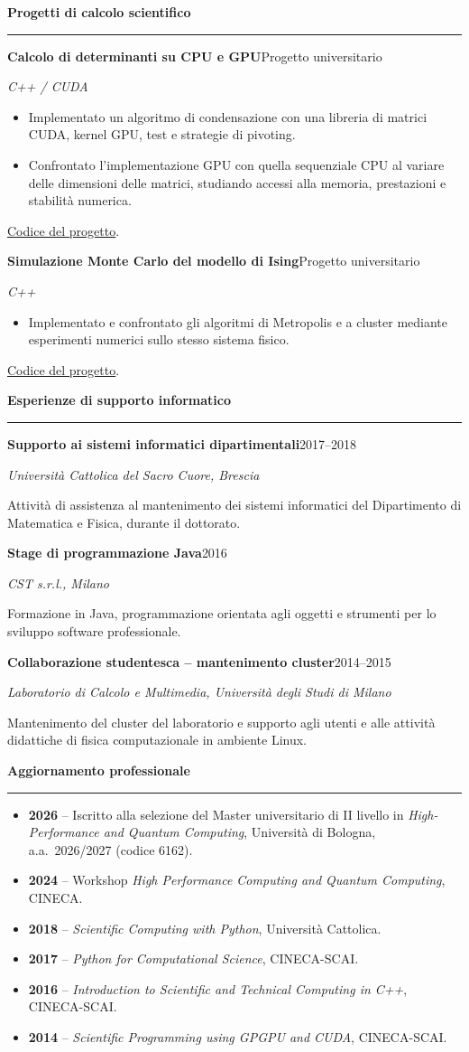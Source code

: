 \documentclass[10pt,a4paper]{article}
\newcommand{\cvsection}[1]{%
    \Needspace{4\baselineskip}%
    \vspace{0.8em}%
    {\large\bfseries\color{accent} #1}\par
    \vspace{0.2em}\hrule\vspace{0.45em}%
}
\newcommand{\entry}[4]{%
    \Needspace{4\baselineskip}%
    \textbf{#1}\hfill #2\par
    \textit{#3}\par
    #4\par\vspace{0.45em}%
}
\begin{document}
\newpage
\cvsection{Progetti di calcolo scientifico}
\entry{Calcolo di determinanti su CPU e GPU}{Progetto universitario}{C++ / CUDA}{%
\begin{itemize}
    \item Implementato un algoritmo di condensazione con una libreria di matrici CUDA, kernel GPU, test e strategie di pivoting.
    \item Confrontato l'implementazione GPU con quella sequenziale CPU al variare delle dimensioni delle matrici, studiando accessi alla memoria, prestazioni e stabilità numerica.
\end{itemize}
\href{https://github.com/MasterToninus/Computational-Physics-Exercise/tree/master/Condensation\%20Algorithm\%20in\%20CUDA}{Codice del progetto}.}
\entry{Simulazione Monte Carlo del modello di Ising}{Progetto universitario}{C++}{%
\begin{itemize}
    \item Implementato e confrontato gli algoritmi di Metropolis e a cluster mediante esperimenti numerici sullo stesso sistema fisico.
\end{itemize}
\href{https://github.com/MasterToninus/Computational-Physics-Exercise/tree/master/Ising\%20simulation\%20Metropolis\%20vs\%20Cluster}{Codice del progetto}.}

\cvsection{Esperienze di supporto informatico}
\entry{Supporto ai sistemi informatici dipartimentali}{2017--2018}{Università Cattolica del Sacro Cuore, Brescia}{%
Attività di assistenza al mantenimento dei sistemi informatici del Dipartimento di Matematica e Fisica, durante il dottorato.}
\entry{Stage di programmazione Java}{2016}{CST s.r.l., Milano}{%
Formazione in Java, programmazione orientata agli oggetti e strumenti per lo sviluppo software professionale.}
\entry{Collaborazione studentesca -- mantenimento cluster}{2014--2015}{Laboratorio di Calcolo e Multimedia, Università degli Studi di Milano}{%
Mantenimento del cluster del laboratorio e supporto agli utenti e alle attività didattiche di fisica computazionale in ambiente Linux.}

\cvsection{Aggiornamento professionale}
\begin{itemize}
    \item \textbf{2026} -- Iscritto alla selezione del Master universitario di II livello in \emph{High-Performance and Quantum Computing}, Università di Bologna, a.a.\ 2026/2027 (codice 6162).
    \item \textbf{2024} -- Workshop \emph{High Performance Computing and Quantum Computing}, CINECA.
    \item \textbf{2018} -- \emph{Scientific Computing with Python}, Università Cattolica.
    \item \textbf{2017} -- \emph{Python for Computational Science}, CINECA-SCAI.
    \item \textbf{2016} -- \emph{Introduction to Scientific and Technical Computing in C++}, CINECA-SCAI.
    \item \textbf{2014} -- \emph{Scientific Programming using GPGPU and CUDA}, CINECA-SCAI.
\end{itemize}
\end{document}
